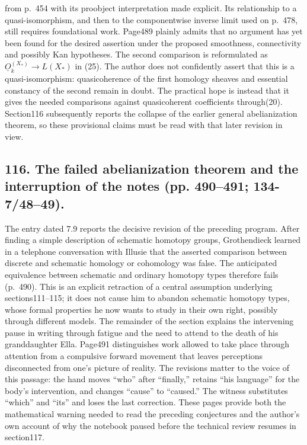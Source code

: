 \documentclass[10pt,oneside]{book}
\begin{document}
from p.~454 with its proobject interpretation made explicit. Its relationship to a quasi-isomorphism, and then to the componentwise inverse limit used on p.~478, still requires foundational work. Page489 plainly admits that no argument has yet been found for the desired assertion under the proposed smoothness, connectivity and possibly Kan hypotheses. The second comparison is reformulated as $\underline O_k^{(X_*)}\to L(X_*)$ in (25). The author does not confidently assert that this is a quasi-isomorphism: quasicoherence of the first homology sheaves and essential constancy of the second remain in doubt. The practical hope is instead that it gives the needed comparisons against quasicoherent coefficients through(20). Section116 subsequently reports the collapse of the earlier general abelianization theorem, so these provisional claims must be read with that later revision in view.

\subsection*{116. The failed abelianization theorem and the interruption of the notes (pp. 490--491; 134-7/48--49).}
The entry dated 7.9 reports the decisive revision of the preceding program. After finding a simple description of schematic homotopy groups, Grothendieck learned in a telephone conversation with Illusie that the asserted comparison between discrete and schematic homology or cohomology was false. The anticipated equivalence between schematic and ordinary homotopy types therefore fails (p.~490). This is an explicit retraction of a central assumption underlying sections111--115; it does not cause him to abandon schematic homotopy types, whose formal properties he now wants to study in their own right, possibly through different models. The remainder of the section explains the intervening pause in writing through fatigue and the need to attend to the death of his granddaughter Ella. Page491 distinguishes work allowed to take place through attention from a compulsive forward movement that leaves perceptions disconnected from one's picture of reality. The revisions matter to the voice of this passage: the hand moves ``who'' after ``finally,'' retains ``his language'' for the body's intervention, and changes ``cause'' to ``caused.'' The witness substitutes ``which'' and ``its'' and loses the last correction. These pages provide both the mathematical warning needed to read the preceding conjectures and the author's own account of why the notebook paused before the technical review resumes in section117.
\end{document}
